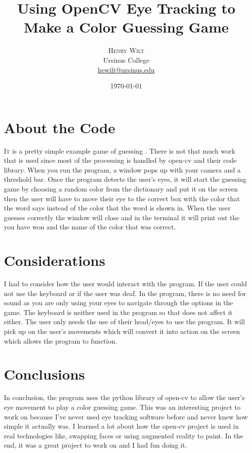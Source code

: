 \documentclass[twoside,twocolumn]{article}
\title{Using OpenCV Eye Tracking to Make a Color Guessing Game} %
\author{%
\textsc{Henry Wilt} \\[1ex]%
\normalsize Ursinus College \\ %
\normalsize \href{mailto:hewilt@ursinus.edu}{hewilt@ursinus.edu} %
}
\date{\today} %
\begin{document}
\maketitle


\section{About the Code}

\lettrine[nindent=0em,lines=2]{I} t is a pretty simple example game of guessing \cite{assignmentgithub}. There is not that much work that is used since most of the processing is handled by open-cv and their code library. When you run the program, a window pops up with your camera and a threshold bar. Once the program detects the user's eyes, it will start the guessing game by choosing a random color from the dictionary and put it on the screen then the user will have to move their eye to the correct box with the color that the word says instead of the color that the word is shown in. When the user guesses correctly the window will close and in the terminal it will print out the you have won and the name of the color that was correct. 


\section{Considerations}
I had to consider how the user would interact with the program. If the user could not use the keyboard or if the user was deaf. In the program, there is no need for sound as you are only using your eyes to navigate through the options in the game. The keyboard is neither used in the program so that does not affect it either. The user only needs the use of their head/eyes to use the program. It will pick up on the user's movements which will convert it into action on the screen which allows the program to function.


\section{Conclusions}
In conclusion, the program uses the python library of open-cv to allow the user's eye movement to play a color guessing game. This was an interesting project to work on because I've never used eye tracking software before and never knew how simple it actually was. I learned a lot about how the open-cv project is used in real technologies like, swapping faces or using augmented reality to paint. In the end, it was a great project to work on and I had fun doing it.
\end{document}
